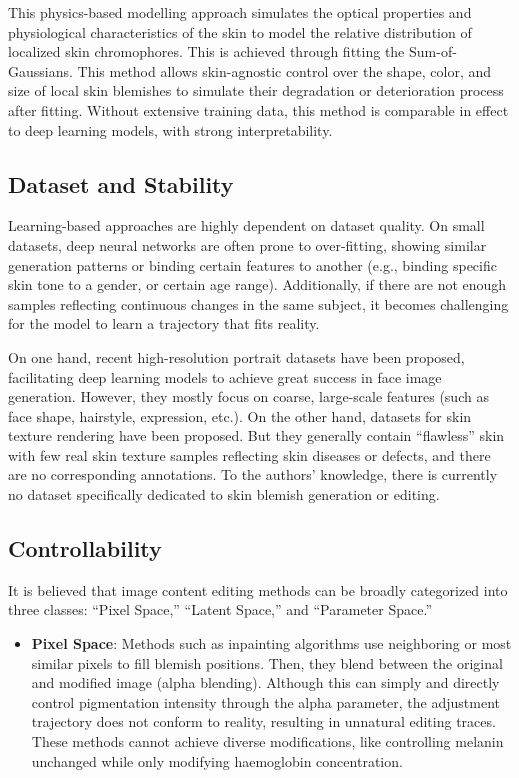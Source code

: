 \begin{spacing}{1.5}
This physics-based modelling approach simulates the optical properties and physiological characteristics of the skin to model the relative distribution of localized skin chromophores. This is achieved through fitting the Sum-of-Gaussians. This method allows skin-agnostic control over the shape, color, and size of local skin blemishes to simulate their degradation or deterioration process after fitting. Without extensive training data, this method is comparable in effect to deep learning models, with strong interpretability.

\subsection{Dataset and Stability}

Learning-based approaches are highly dependent on dataset quality. On small datasets, deep neural networks are often prone to over-fitting, showing similar generation patterns or binding certain features to another (e.g., binding specific skin tone to a gender, or certain age range). Additionally, if there are not enough samples reflecting continuous changes in the same subject, it becomes challenging for the model to learn a trajectory that fits reality.

On one hand, recent high-resolution portrait datasets\cite{DBLP:journals/corr/abs-1812-04948} have been proposed, facilitating deep learning models to achieve great success in face image generation. However, they mostly focus on coarse, large-scale features (such as face shape, hairstyle, expression, etc.). On the other hand, datasets for skin texture rendering\cite{Bai_2023_CVPR} have been proposed. But they generally contain “flawless” skin with few real skin texture samples reflecting skin diseases or defects, and there are no corresponding annotations. To the authors' knowledge, there is currently no dataset specifically dedicated to skin blemish generation or editing.


\subsection{Controllability}
It is believed that image content editing methods can be broadly categorized into three classes: “Pixel Space,” “Latent Space,” and “Parameter Space.”
\begin{itemize}
    \item \textbf{Pixel Space}: Methods such as inpainting algorithms use neighboring or most similar pixels to fill blemish positions\cite{doi:10.1080/10867651.2004.10487596, bertalmio2001navier}. Then, they blend between the original and modified image (alpha blending). Although this can simply and directly control pigmentation intensity through the alpha parameter, the adjustment trajectory does not conform to reality, resulting in unnatural editing traces. These methods cannot achieve diverse modifications, like controlling melanin unchanged while only modifying haemoglobin concentration.


\end{itemize}
\end{spacing}
